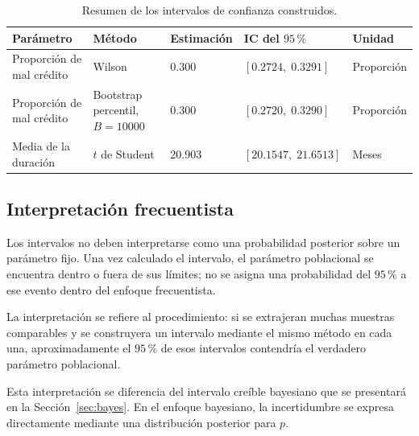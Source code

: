 \begin{table}[H]
    \centering
    \caption{Resumen de los intervalos de confianza construidos.}
    \label{tab:resumen-intervalos}

    \begin{tabularx}{0.94\textwidth}{
        @{}
        >{\raggedright\arraybackslash}p{3.2cm}
        >{\raggedright\arraybackslash}p{3.4cm}
        >{\centering\arraybackslash}p{2.0cm}
        >{\centering\arraybackslash}p{2.0cm}
        X
        @{}
    }
        \toprule
        Parámetro
        & Método
        & Estimación
        & IC del \(95\,\%\)
        & Unidad \\
        \midrule

        Proporción de mal crédito
        & Wilson
        & \num{0.300}
        & \([0.2724,\;0.3291]\)
        & Proporción \\

        Proporción de mal crédito
        & Bootstrap percentil,
          \(B=\num{10000}\)
        & \num{0.300}
        & \([0.2720,\;0.3290]\)
        & Proporción \\

        Media de la duración
        & \(t\) de Student
        & \num{20.903}
        & \([20.1547,\;21.6513]\)
        & Meses \\

        \bottomrule
    \end{tabularx}
\end{table}

\subsection{Interpretación frecuentista}

Los intervalos no deben interpretarse como una probabilidad posterior
sobre un parámetro fijo. Una vez calculado el intervalo, el parámetro
poblacional se encuentra dentro o fuera de sus límites; no se asigna una
probabilidad del \(95\,\%\) a ese evento dentro del enfoque
frecuentista.

La interpretación se refiere al procedimiento: si se extrajeran muchas
muestras comparables y se construyera un intervalo mediante el mismo
método en cada una, aproximadamente el \(95\,\%\) de esos intervalos
contendría el verdadero parámetro poblacional.

Esta interpretación se diferencia del intervalo creíble bayesiano que se
presentará en la Sección~\ref{sec:bayes}. En el enfoque bayesiano, la
incertidumbre se expresa directamente mediante una distribución
posterior para \(p\).

